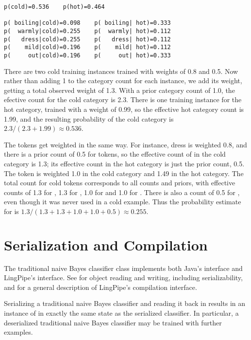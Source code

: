 \begin{verbatim}
p(cold)=0.536    p(hot)=0.464

p( boiling|cold)=0.098    p( boiling| hot)=0.333
p(  warmly|cold)=0.255    p(  warmly| hot)=0.112
p(   dress|cold)=0.255    p(   dress| hot)=0.112
p(    mild|cold)=0.196    p(    mild| hot)=0.112
p(     out|cold)=0.196    p(     out| hot)=0.333
\end{verbatim}
%
There are two cold training instances trained with weights of 0.8 and
0.5.  Now rather than adding 1 to the category count for each
instance, we add its weight, getting a total observed weight of 1.3.
With a prior category count of 1.0, the efective count for the cold
category is 2.3.  There is one training instance for the hot category,
trained with a weight of 0.99, so the effective hot category count is
1.99, and the resulting probability of the cold category is
$2.3/(2.3+1.99) \approx 0.536$.

The tokens get weighted in the same way.  For instance, dress is
weighted 0.8, and there is a prior count of 0.5 for tokens, so the
effective count of  in the cold category is 1.3;
its effective count in the hot category is just the prior count, 0.5.
The token  is weighted 1.0 in the cold category and
1.49 in the hot category.  The total count for cold tokens corresponds
to all counts and priors, with effective counts of 1.3 for
, 1.3 for , 1.0 for
 and 1.0 for .  There is also
a count of 0.5 for , even though it was never
used in a cold example.  Thus the probability estimate for
 is $1.3/(1.3 + 1.3 + 1.0 + 1.0 + 0.5) \approx
0.255$.


\section{Serialization and Compilation}

The traditional naive Bayes classifier class implements both Java's
 interface and LingPipe's 
interface.  See  for object reading and
writing, including serializability, and  for a
general description of LingPipe's compilation interface.

Serializing a traditional naive Bayes classifier and reading it
back in results in an instance of  in
exactly the same state as the serialized classifier.  In particular,
a deserialized traditional naive Bayes classifier may be trained
with further examples.  

